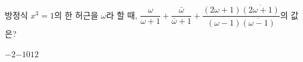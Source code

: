 방정식 $x^3=1$의 한 허근을 $\omega$라 할 때, $\dfrac{\omega}{\omega+1}+\dfrac{\bar{\omega}}{\bar{\omega}+1}+\dfrac{(2\omega+1)\overline{(2\omega+1)}}{(\omega-1)\overline{(\omega-1)}}$의 값은? 
\begin{choices32}{$-2$}{$-1$}{$0$}{$1$}{$2$}\end{choices32}
